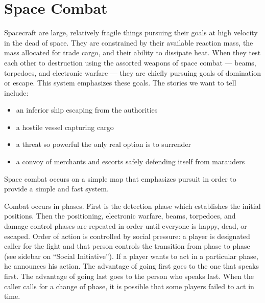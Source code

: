 \chapter{Space Combat}\label{sec:space-combat} %



Spacecraft are large, relatively fragile things pursuing their goals at high velocity in the dead of space. They are constrained by their available reaction mass, the mass  allocated for trade cargo, and their ability to dissipate heat. When they test each other to destruction using the assorted weapons of space combat --- beams, torpedoes, and electronic warfare --- they are chiefly pursuing goals of domination or escape. This system emphasizes these goals. The stories we want to tell include:

\begin{itemize}
\item an inferior ship escaping from the authorities
\item a hostile vessel capturing cargo
\item a threat so powerful the only real option is to surrender
\item a convoy of merchants and escorts safely defending itself from marauders
\end{itemize}

Space combat occurs on a simple map that emphasizes pursuit in order to provide a simple and fast system.

Combat occurs in phases. First is the detection phase which establishes the initial positions. Then the positioning, electronic warfare, beams, torpedoes, and damage control phases are repeated in order until everyone is happy, dead, or escaped. Order of action is controlled by social pressure: a player is designated caller for the fight and that person controls the transition from phase to phase (see sidebar on ``Social Initiative''). If a player wants to act in a particular phase, he announces his action. The advantage of going first goes to the one that speaks first. The advantage of going last goes to the person who speaks last. When the caller calls for a change of phase, it is possible that some players failed to act in time.









